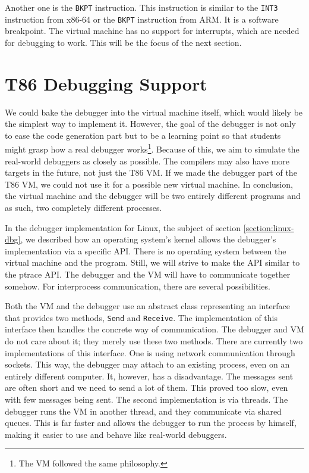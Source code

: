 Another one is the \texttt{BKPT} instruction. This instruction is similar to
the \texttt{INT3} instruction from x86-64 or the \texttt{BKPT} instruction from
ARM. It is a software breakpoint. The virtual machine has no support for
interrupts, which are needed for debugging to work. This will be the focus of
the next section.

\section{T86 Debugging Support}
We could bake the debugger into the virtual machine itself, which would likely
be the simplest way to implement it. However, the goal of the debugger is not
only to ease the code generation part but to be a learning point so that
students might grasp how a real debugger works\footnote{The VM followed the
same philosophy.}. Because of this, we aim to simulate the real-world debuggers
as closely as possible. The compilers may also have more targets in the future,
not just the T86 VM. If we made the debugger part of the T86 VM, we could not
use it for a possible new virtual machine. In conclusion, the virtual machine
and the debugger will be two entirely different programs and as such, two
completely different processes.

In the debugger implementation for Linux, the subject of section
\ref{section:linux-dbg}, we described how an operating system's kernel allows
the debugger's implementation via a specific API. There is no operating system
between the virtual machine and the program. Still, we will strive to make the
API similar to the ptrace API. The debugger and the VM will have to communicate
together somehow. For interprocess communication, there are several
possibilities.

Both the VM and the debugger use an abstract class representing an interface
that provides two methods, \texttt{Send} and \texttt{Receive}. The
implementation of this interface then handles the concrete way of
communication. The debugger and VM do not care about it; they merely use these
two methods. There are currently two implementations of this interface. One is
using network communication through sockets. This way, the debugger may attach
to an existing process, even on an entirely different computer. It, however,
has a disadvantage. The messages sent are often short and we need to send a lot
of them. This proved too slow, even with few messages being sent. The second
implementation is via threads. The debugger runs the VM in another thread, and
they communicate via shared queues. This is far faster and allows the debugger
to run the process by himself, making it easier to use and behave like
real-world debuggers.

